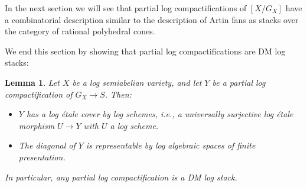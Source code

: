 \documentclass[11pt]{amsart}
\newtheorem{lemma}[theorem]{Lemma}
\theoremstyle{definition}
\theoremstyle{remark}
\begin{document}
In the next section we will see that partial log compactifications of $[X/G_X]$ have a
combinatorial description similar to the description of Artin fans as
stacks over the category of rational polyhedral cones.

We end this section by showing that partial log compactifications are DM log stacks:

\begin{lemma}
	\label{lem:part_cptifications_are_nice}
	Let $X$ be a log semiabelian variety, and let $Y$ be a partial log compactification of $G_X\to S$. Then:
	\begin{itemize}
		\item $Y$ has a log étale cover by log schemes, i.e., a universally surjective log étale morphism $U\to Y$ with $U$ a log scheme.
		\item The diagonal of $Y$ is representable by log algebraic spaces of finite presentation.
	\end{itemize}
	In particular, any partial log compactification is a DM log stack.
\end{lemma}
\end{document}
